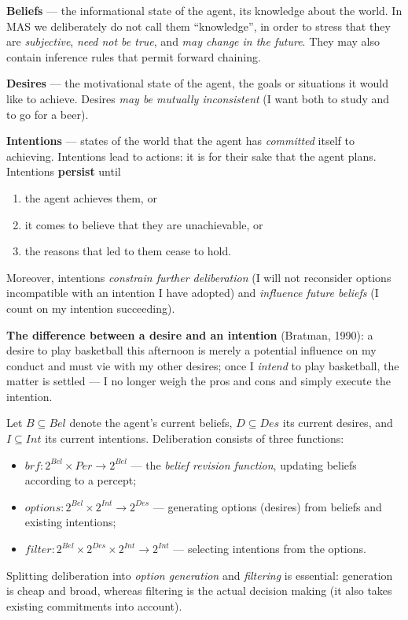 \documentclass[11pt,a4paper]{article}
\theoremstyle{definition}
\providecommand{\uv}[1]{``#1''}
\begin{document}
\begin{defbox}
\textbf{Beliefs} --- the informational state of the agent, its knowledge about the world.
In MAS we deliberately do not call them \uv{knowledge}, in order to stress that they are
\emph{subjective}, \emph{need not be true}, and \emph{may change in the future}. They may also
contain inference rules that permit forward chaining.

\textbf{Desires} --- the motivational state of the agent, the goals or situations it would like to
achieve. Desires \emph{may be mutually inconsistent} (I want both to study and to go for a beer).

\textbf{Intentions} --- states of the world that the agent has \emph{committed} itself to achieving.
Intentions lead to actions: it is for their sake that the agent plans. Intentions \textbf{persist}
until
\begin{enumerate}
\item the agent achieves them, or
\item it comes to believe that they are unachievable, or
\item the reasons that led to them cease to hold.
\end{enumerate}
Moreover, intentions \emph{constrain further deliberation} (I will not reconsider options
incompatible with an intention I have adopted) and \emph{influence future beliefs} (I count on my
intention succeeding).
\end{defbox}

\noindent\textbf{The difference between a desire and an intention} (Bratman, 1990): a desire to
play basketball this afternoon is merely a potential influence on my conduct and must vie with
my other desires; once I \emph{intend} to play basketball, the matter is settled --- I no longer
weigh the pros and cons and simply execute the intention.

\begin{defbox}
Let $B \subseteq \mathit{Bel}$ denote the agent's current beliefs, $D \subseteq \mathit{Des}$ its
current desires, and $I \subseteq \mathit{Int}$ its current intentions. Deliberation consists of
three functions:
\begin{itemize}
\item $\mathit{brf} : 2^{\mathit{Bel}} \times \mathit{Per} \to 2^{\mathit{Bel}}$ ---
  the \emph{belief revision function}, updating beliefs according to a percept;
\item $\mathit{options} : 2^{\mathit{Bel}} \times 2^{\mathit{Int}} \to 2^{\mathit{Des}}$ ---
  generating options (desires) from beliefs and existing intentions;
\item $\mathit{filter} : 2^{\mathit{Bel}} \times 2^{\mathit{Des}} \times 2^{\mathit{Int}}
  \to 2^{\mathit{Int}}$ --- selecting intentions from the options.
\end{itemize}
Splitting deliberation into \emph{option generation} and \emph{filtering} is essential: generation
is cheap and broad, whereas filtering is the actual decision making (it also takes existing
commitments into account).
\end{defbox}
\end{document}
